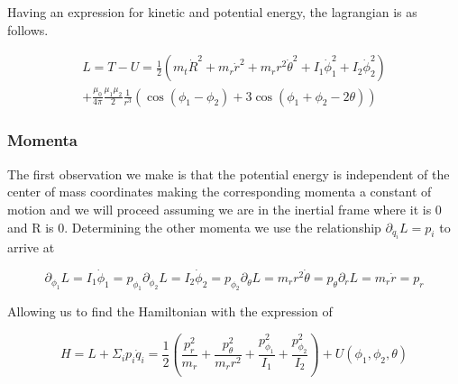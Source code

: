 \documentclass[12pt]{amsart}
\begin{document}
Having an expression for kinetic and potential energy, the lagrangian is as follows.

\begin{equation}
  \begin{multlined}
    L=T-U=
    \frac{1}{2}(
        m_t \dot R^2
        +m_r \dot r^2
        +m_r r^2 \dot \theta^2
        + I_1 \dot \phi_1^2
        + I_2 \dot \phi_2^2
    )
    \\
    +
    \frac{\mu_0}{4\pi}
    \frac{\mu_1 \mu_2}{2}
    \frac{1}{r^3}(
        \cos(\phi_1-\phi_2)
        +3\cos(\phi_1+\phi_2 -2\theta)
    )
  \end{multlined}
\end{equation}

\subsubsection{Momenta}

The first observation we make is that the potential energy is independent of the center of mass coordinates making the corresponding momenta a constant of motion and we will proceed assuming we are in the inertial frame where it is 0 and R is 0. Determining the other momenta we use the relationship $\partial_{\dot q_i} L =p_i$ to arrive at

\begin{subequations}
    \begin{equation}
        \partial_{\dot \phi_1} L = I_1\dot \phi_1 = p_{\phi_1}
    \end{equation}
    \begin{equation}
        \partial_{\dot \phi_2} L =I_2\dot \phi_2 = p_{\phi_2}
    \end{equation}
    \begin{equation}
        \partial_{\dot \theta} L =m_r r^2 \dot \theta = p_{\theta}
    \end{equation}
    \begin{equation}
        \partial_{\dot r} L = m_r \dot r = p_r
    \end{equation}
\end{subequations}

Allowing us to find the Hamiltonian with the expression of 

\begin{equation}
H=L+\Sigma_i p_i \dot q_i
=
\frac{1}{2}(
	\frac{p_r^2}{m_r}
	+\frac{p_\theta^2}{m_r r^2}
	+\frac{p_{\phi_1}^2}{I_1}
	+\frac{p_{\phi_2}^2}{I_2}
)+U(\phi_1,\phi_2,\theta)
\end{equation}
\end{document}
